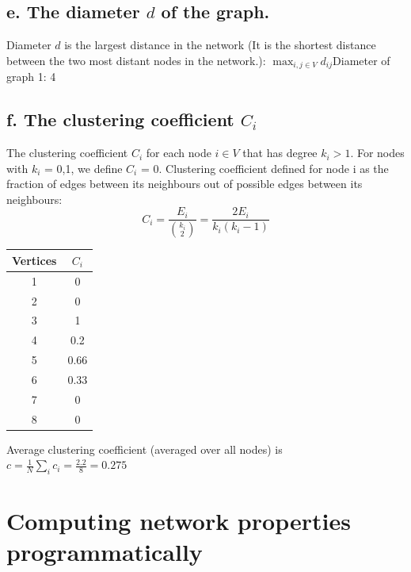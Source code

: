 \documentclass[a4paper,12pt]{article}
\begin{document}
\subsection*{e. The diameter $d$ of the graph.}
Diameter $d$ is the largest distance in the network (It is the shortest distance between the two most distant nodes in the network.): $\max_{i,j \in V}d_{ij}$\newline\newline Diameter of graph 1: 4

\subsection*{f. The clustering coefficient $C_i$}
The clustering coefficient $C_i$ for each node $i \in V$ that has degree $k_i > 1$. For nodes with $k_i$ = 0,1, we define $C_i$ = 0.\newline\newline
Clustering coefficient defined for node i as the fraction of edges between
its neighbours out of possible edges between its neighbours:
$$C_i = \frac{E_i}{{k_i\choose2}} = \frac{2E_i}{k_i(k_i - 1)}$$
\begin{table}[h]
\centering
\begin{tabular}{c|c}
Vertices & $C_i$\\
\hline
1 & 0\\
2 & 0\\
3 & 1\\
4 & 0.2\\
5 & 0.66\\
6 & 0.33\\
7 & 0\\
8 & 0 
\end{tabular}
\end{table}
\newline
Average clustering coefficient (averaged over all nodes) is $c = \frac{1}{N}\sum_{i}c_i = \frac{2.2}{8} = 0.275$

\section{Computing network properties programmatically}
\end{document}
